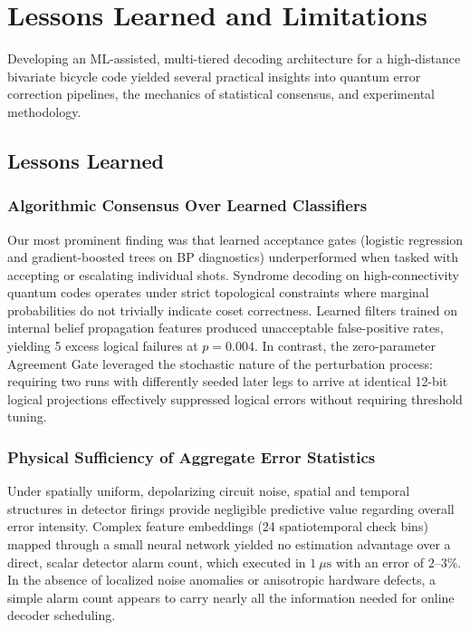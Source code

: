 \section{Lessons Learned and Limitations}

Developing an ML-assisted, multi-tiered decoding architecture for a high-distance bivariate bicycle code yielded several practical insights into quantum error correction pipelines, the mechanics of statistical consensus, and experimental methodology.

\subsection{Lessons Learned}

\subsubsection{Algorithmic Consensus Over Learned Classifiers}
Our most prominent finding was that learned acceptance gates (logistic regression and gradient-boosted trees on BP diagnostics) underperformed when tasked with accepting or escalating individual shots. Syndrome decoding on high-connectivity quantum codes operates under strict topological constraints where marginal probabilities do not trivially indicate coset correctness. Learned filters trained on internal belief propagation features produced unacceptable false-positive rates, yielding 5 excess logical failures at $p = 0.004$. In contrast, the zero-parameter Agreement Gate leveraged the stochastic nature of the perturbation process: requiring two runs with differently seeded later legs to arrive at identical 12-bit logical projections effectively suppressed logical errors without requiring threshold tuning.

\subsubsection{Physical Sufficiency of Aggregate Error Statistics}
Under spatially uniform, depolarizing circuit noise, spatial and temporal structures in detector firings provide negligible predictive value regarding overall error intensity. Complex feature embeddings (24 spatiotemporal check bins) mapped through a small neural network yielded no estimation advantage over a direct, scalar detector alarm count, which executed in $1\ \mu\text{s}$ with an error of $2\text{--}3\%$. In the absence of localized noise anomalies or anisotropic hardware defects, a simple alarm count appears to carry nearly all the information needed for online decoder scheduling.

